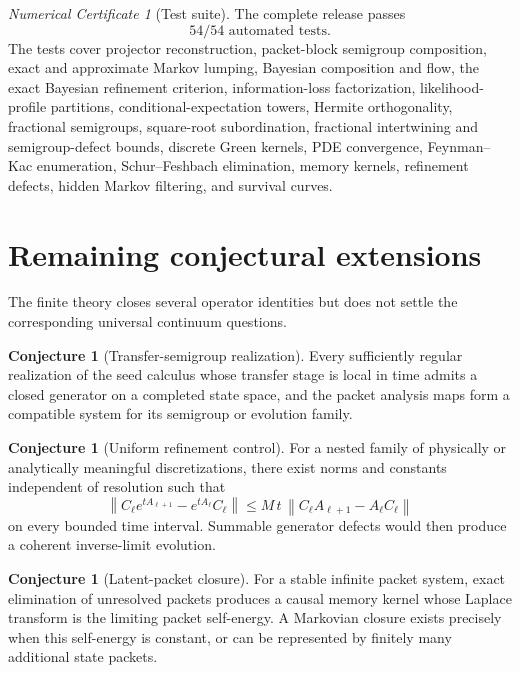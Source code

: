 \documentclass[11pt]{article}
\theoremstyle{definition}
\newtheorem{conjecture}[theorem]{Conjecture}
\theoremstyle{remark}
\newtheorem{certificate}[theorem]{Numerical Certificate}
\newcommand{\norm}[1]{\left\lVert#1\right\rVert}
\begin{document}
\begin{certificate}[Test suite]
The complete release passes
\[
\boxed{54/54\text{ automated tests}.}
\]
The tests cover projector reconstruction, packet-block semigroup composition, exact and approximate Markov lumping, Bayesian composition and flow, the exact Bayesian refinement criterion, information-loss factorization, likelihood-profile partitions, conditional-expectation towers, Hermite orthogonality, fractional semigroups, square-root subordination, fractional intertwining and semigroup-defect bounds, discrete Green kernels, PDE convergence, Feynman--Kac enumeration, Schur--Feshbach elimination, memory kernels, refinement defects, hidden Markov filtering, and survival curves.
\end{certificate}

\section{Remaining conjectural extensions}

The finite theory closes several operator identities but does not settle the corresponding universal continuum questions.

\begin{conjecture}[Transfer-semigroup realization]
Every sufficiently regular realization of the seed calculus whose transfer stage is local in time admits a closed generator on a completed state space, and the packet analysis maps form a compatible system for its semigroup or evolution family.
\end{conjecture}

\begin{conjecture}[Uniform refinement control]
For a nested family of physically or analytically meaningful discretizations, there exist norms and constants independent of resolution such that
\[
\norm{C_\ell e^{tA_{\ell+1}}-e^{tA_\ell}C_\ell}
\le
M\,t\,\norm{C_\ell A_{\ell+1}-A_\ell C_\ell}
\]
on every bounded time interval. Summable generator defects would then produce a coherent inverse-limit evolution.
\end{conjecture}

\begin{conjecture}[Latent-packet closure]
For a stable infinite packet system, exact elimination of unresolved packets produces a causal memory kernel whose Laplace transform is the limiting packet self-energy. A Markovian closure exists precisely when this self-energy is constant, or can be represented by finitely many additional state packets.
\end{conjecture}
\end{document}
